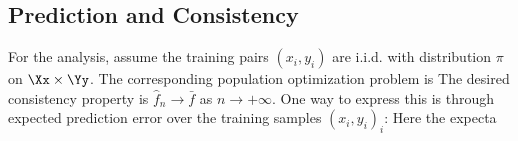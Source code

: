 \subsection{Prediction and Consistency}

For the analysis, assume the training pairs $(x_i,y_i)$ are i.i.d. with distribution $\pi$ on $\Xx \times \Yy$. The corresponding population optimization problem is
The desired consistency property is $\hat f_n \rightarrow \bar f$ as $n \rightarrow +\infty$. One way to express this is through expected prediction error over the training samples $(x_i,y_i)_i$:
Here the expecta